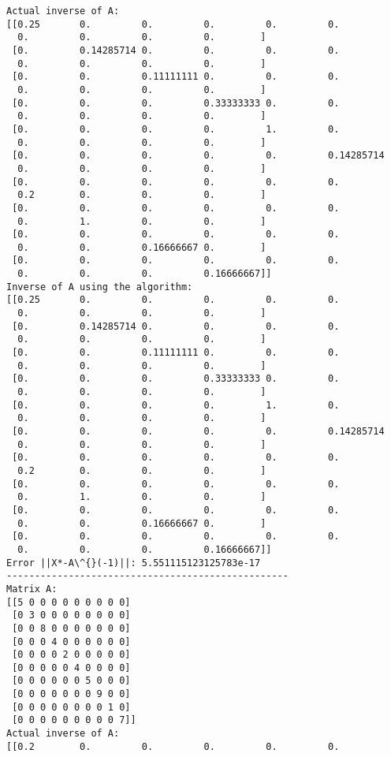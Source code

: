 \documentclass[11pt]{article}
\begin{document}
\begin{Verbatim}[commandchars=\\\{\}]
Actual inverse of A:
[[0.25       0.         0.         0.         0.         0.
  0.         0.         0.         0.        ]
 [0.         0.14285714 0.         0.         0.         0.
  0.         0.         0.         0.        ]
 [0.         0.         0.11111111 0.         0.         0.
  0.         0.         0.         0.        ]
 [0.         0.         0.         0.33333333 0.         0.
  0.         0.         0.         0.        ]
 [0.         0.         0.         0.         1.         0.
  0.         0.         0.         0.        ]
 [0.         0.         0.         0.         0.         0.14285714
  0.         0.         0.         0.        ]
 [0.         0.         0.         0.         0.         0.
  0.2        0.         0.         0.        ]
 [0.         0.         0.         0.         0.         0.
  0.         1.         0.         0.        ]
 [0.         0.         0.         0.         0.         0.
  0.         0.         0.16666667 0.        ]
 [0.         0.         0.         0.         0.         0.
  0.         0.         0.         0.16666667]]
Inverse of A using the algorithm:
[[0.25       0.         0.         0.         0.         0.
  0.         0.         0.         0.        ]
 [0.         0.14285714 0.         0.         0.         0.
  0.         0.         0.         0.        ]
 [0.         0.         0.11111111 0.         0.         0.
  0.         0.         0.         0.        ]
 [0.         0.         0.         0.33333333 0.         0.
  0.         0.         0.         0.        ]
 [0.         0.         0.         0.         1.         0.
  0.         0.         0.         0.        ]
 [0.         0.         0.         0.         0.         0.14285714
  0.         0.         0.         0.        ]
 [0.         0.         0.         0.         0.         0.
  0.2        0.         0.         0.        ]
 [0.         0.         0.         0.         0.         0.
  0.         1.         0.         0.        ]
 [0.         0.         0.         0.         0.         0.
  0.         0.         0.16666667 0.        ]
 [0.         0.         0.         0.         0.         0.
  0.         0.         0.         0.16666667]]
Error ||X*-A\^{}(-1)||: 5.551115123125783e-17
--------------------------------------------------
Matrix A:
[[5 0 0 0 0 0 0 0 0 0]
 [0 3 0 0 0 0 0 0 0 0]
 [0 0 8 0 0 0 0 0 0 0]
 [0 0 0 4 0 0 0 0 0 0]
 [0 0 0 0 2 0 0 0 0 0]
 [0 0 0 0 0 4 0 0 0 0]
 [0 0 0 0 0 0 5 0 0 0]
 [0 0 0 0 0 0 0 9 0 0]
 [0 0 0 0 0 0 0 0 1 0]
 [0 0 0 0 0 0 0 0 0 7]]
Actual inverse of A:
[[0.2        0.         0.         0.         0.         0.

\end{Verbatim}
\end{document}
